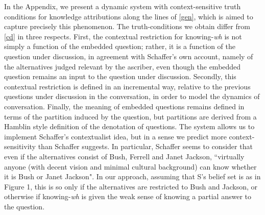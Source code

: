 In the Appendix, we present a dynamic system with
context-sensitive truth conditions for knowledge attributions
along the lines of \ref{gen}, which is aimed to capture precisely
this phenomenon. The truth-conditions we obtain differ from
\ref{cd} in three respects. First, the contextual restriction for
knowing-\emph{wh} is not simply a function of the embedded
question; rather, it is a function of the question under
discussion, in agreement with Schaffer's own account, namely of
the alternatives judged relevant by the ascriber, even though the
embedded question remains an input to the question under
discussion. Secondly, this contextual restriction is defined in an
incremental way, relative to the previous questions under
discussion in the conversation, in order to model the dynamics of
conversation. Finally, the meaning of embedded questions remains
defined in terms of the partition induced by the question, but
partitions are derived from a Hamblin style definition of the
denotation of questions. The system allows us to implement
Schaffer's contextualist idea, but in a sense we predict more
context-sensitivity than Schaffer suggests. In particular,
Schaffer seems to consider that even if the alternatives consist
of Bush, Ferrell and Janet Jackson, ``virtually anyone (with
decent vision and minimal cultural background) can know whether it
is Bush or Janet Jackson". In our approach, assuming that S's
belief set is as in Figure 1, this is so only if the alternatives
are restricted to Bush and Jackson, or otherwise if
knowing-\emph{wh} is given the weak sense of knowing a partial
answer to the question.


